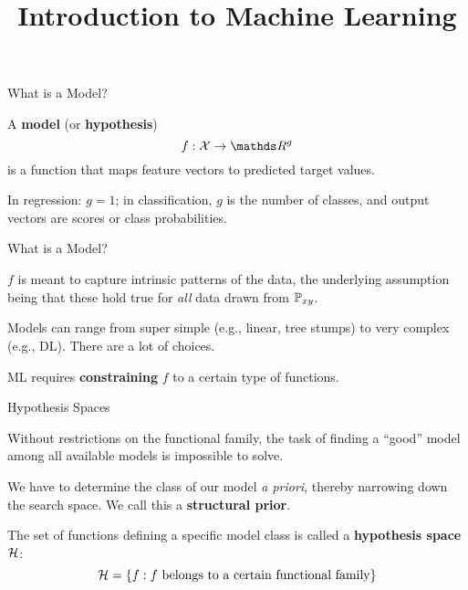 \documentclass[11pt,compress,t,notes=noshow, xcolor=table]{beamer}
\title{Introduction to Machine Learning}
\begin{document}


\begin{framei}{What is a Model?}
\item A \textbf{model} (or \textbf{hypothesis}) 
$$
f : \Xspace \rightarrow \R^g
$$ 
is a function that maps feature vectors to predicted target values.
\item In regression: $g = 1$; in classification, $g$ is the number of classes, and output vectors are scores or class probabilities.
\end{framei}


\begin{framei}{What is a Model?}
\item $f$ is meant to capture intrinsic patterns of the data, the underlying assumption being that these hold true for \emph{all} data drawn from $\mathbb{P}_{xy}$.
\item Models can range from super simple (e.g., linear, tree stumps) to very complex (e.g., DL). There are a lot of choices.
\vfill
{}
\item ML requires \textbf{constraining} $f$ to a certain type of functions.
\end{framei}


\begin{framei}{Hypothesis Spaces}
\item Without restrictions on the functional family, the task of finding a \enquote{good} model among all available models is impossible to solve.
\item We have to determine the class of our model \emph{a priori}, thereby narrowing down the search space. We call this a \textbf{structural prior}.
\item The set of functions defining a specific model class is called a 
\textbf{hypothesis space} $\mathcal{H}$:
$$\mathcal{H} = \{f: f \text{ belongs to a certain functional family}\}$$
\end{framei}
\end{document}
